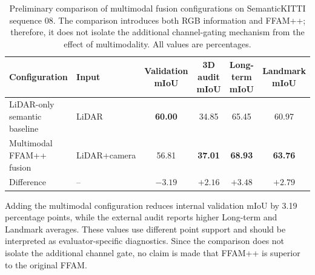 \begin{table}[t]
  \centering
  \caption{Preliminary comparison of multimodal fusion configurations on SemanticKITTI
  sequence 08. The comparison introduces both RGB information and FFAM++;
  therefore, it does not isolate the additional channel-gating mechanism from
  the effect of multimodality. All values are percentages.}
  \label{tab:ablation-multimodal-fusion}
  \small
  \setlength{\tabcolsep}{5pt}
  \renewcommand{\arraystretch}{1.08}
  \begin{tabular}{@{}llcccc@{}}
    \toprule
    Configuration & Input & Validation mIoU & 3D audit mIoU
      & Long-term mIoU & Landmark mIoU \\
    \midrule
    LiDAR-only semantic baseline
      & LiDAR & \textbf{60.00} & 34.85 & 65.45 & 60.97 \\
    Multimodal FFAM++ fusion
      & LiDAR+camera & 56.81 & \textbf{37.01} & \textbf{68.93}
      & \textbf{63.76} \\
    \midrule
    Difference
      & -- & $-3.19$ & $+2.16$ & $+3.48$ & $+2.79$ \\
    \bottomrule
  \end{tabular}
\end{table}

Adding the multimodal configuration reduces internal validation mIoU by 3.19 percentage points, while the external audit reports higher Long-term and Landmark averages. These values use different point support and should be interpreted as evaluator-specific diagnostics. Since the comparison does not isolate the additional channel gate, no claim is made that FFAM++ is superior to the original FFAM.

